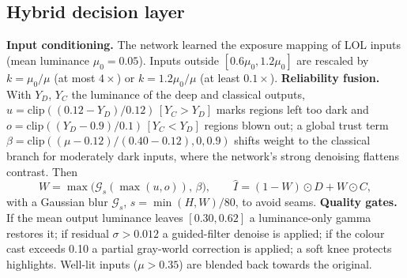 \documentclass[conference]{IEEEtran}
\begin{document}
\subsection{Hybrid decision layer}
\textbf{Input conditioning.} The network learned the exposure mapping of LOL inputs (mean luminance $\mu_0=0.05$).
Inputs outside $[0.6\mu_0, 1.2\mu_0]$ are rescaled by $k=\mu_0/\mu$ (at most $4\times$) or $k=1.2\mu_0/\mu$
(at least $0.1\times$). \textbf{Reliability fusion.} With $Y_D$, $Y_C$ the luminance of the deep and classical
outputs, $u=\mathrm{clip}((0.12-Y_D)/0.12)\,[Y_C>Y_D]$ marks regions left too dark and
$o=\mathrm{clip}((Y_D-0.9)/0.1)\,[Y_C<Y_D]$ regions blown out; a global trust term
$\beta=\mathrm{clip}((\mu-0.12)/(0.40-0.12),0,0.9)$ shifts weight to the classical branch for moderately dark inputs,
where the network's strong denoising flattens contrast. Then
\begin{equation}
W=\max\!\big(\mathcal{G}_{s}(\max(u,o)),\,\beta\big),\qquad \hat I=(1-W)\odot D + W\odot C,
\end{equation}
with a Gaussian blur $\mathcal{G}_s$, $s=\min(H,W)/80$, to avoid seams. \textbf{Quality gates.} If the mean output
luminance leaves $[0.30,0.62]$ a luminance-only gamma restores it; if residual $\sigma>0.012$ a guided-filter
denoise is applied; if the colour cast exceeds 0.10 a partial gray-world correction is applied; a soft knee
protects highlights. Well-lit inputs ($\mu>0.35$) are blended back towards the original.
\end{document}
